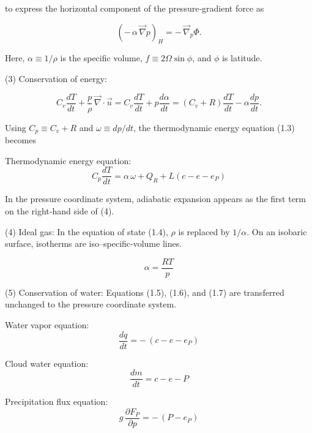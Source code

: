 \documentclass[12pt,openany]{book}
\begin{document}
to express the horizontal component of the pressure‑gradient force as

\begin{equation*}
\left( -\,\alpha \,\vec{\nabla} p \right)_H
=
-\,\vec{\nabla}_p \Phi .
\end{equation*}

Here, $\alpha \equiv 1/\rho$ is the specific volume,
$f \equiv 2 \Omega \sin \phi$,
and $\phi$ is latitude.

(3) Conservation of energy:

\begin{equation*}
C_v \frac{dT}{dt}
+
\frac{p}{\rho}
\,\vec{\nabla} \cdot \vec{u}
=
C_v \frac{dT}{dt}
+
p \frac{d\alpha}{dt}
=
( C_v + R ) \frac{dT}{dt}
-
\alpha \frac{dp}{dt} .
\end{equation*}

Using $C_p \equiv C_v + R$ and $\omega \equiv dp/dt$,
the thermodynamic energy equation (1.3) becomes

Thermodynamic energy equation:
\begin{equation}
C_p \frac{dT}{dt}
=
\alpha \,\omega
+
Q_R
+
L ( c - e - e_P )
\tag{2.4}
\label{eq:2.4}
\end{equation}

In the pressure coordinate system,
adiabatic expansion appears as the first term on the right‑hand side of (4).

(4) Ideal gas:
In the equation of state (1.4), $\rho$ is replaced by $1/\alpha$.
On an isobaric surface, isotherms are iso–specific‑volume lines.

\begin{equation}
\alpha = \frac{R T}{p}
\tag{2.5}
\label{eq:2.5}
\end{equation}

(5) Conservation of water:
Equations (1.5), (1.6), and (1.7) are transferred unchanged to the
pressure coordinate system.

Water vapor equation:
\begin{equation}
\frac{d q}{d t}
=
-\, ( c - e - e_P )
\tag{2.6}
\label{eq:2.6}
\end{equation}

Cloud water equation:
\begin{equation}
\frac{d m}{d t}
=
c - e - P
\tag{2.7}
\label{eq:2.7}
\end{equation}

Precipitation flux equation:
\begin{equation}
g \, \frac{\partial F_P}{\partial p}
=
-\, ( P - e_P )
\tag{2.8}
\label{eq:2.8}
\end{equation}
\end{document}
